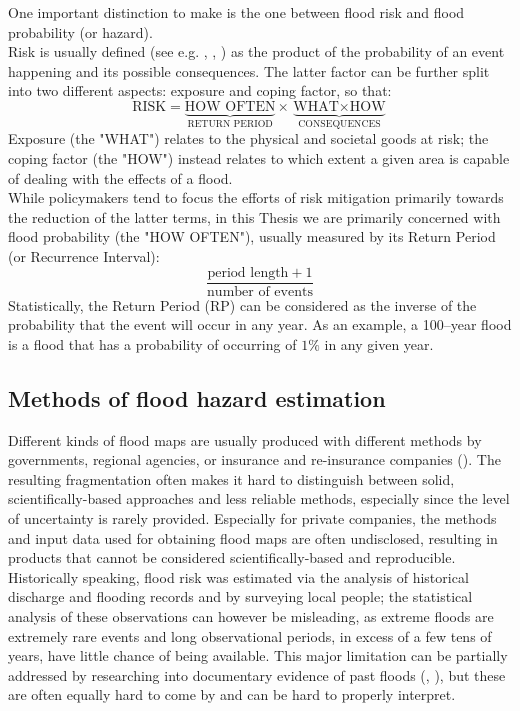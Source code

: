One important distinction to make is the one between flood risk and flood probability (or hazard).\\
Risk is usually defined (see e.g. , \cite{Kron2002, DeMoel2009}, \cite{Merz2007}) as the product of the probability of an event happening and its possible consequences. The latter factor can be further split into two different aspects: exposure and coping factor, so that:
$$\text{RISK} = \underbrace{\text{HOW OFTEN}}_\text{RETURN PERIOD} \times \underbrace{\text{WHAT} \times \text{HOW}}_\text{CONSEQUENCES}$$
Exposure (the "WHAT") relates to the physical and societal goods at risk; the coping factor (the "HOW") instead relates to which extent a given area is capable of dealing with the effects of a flood.\\
While policymakers tend to focus the efforts of risk mitigation primarily towards the reduction of the latter terms, in this Thesis we are primarily concerned with flood probability (the "HOW OFTEN"), usually measured by its Return Period (or Recurrence Interval):
$$\frac{\text{period length} + 1}{\text{number of events}}$$
Statistically, the Return Period (RP) can be considered as the inverse of the probability that the event will occur in any year. As an example, a 100--year flood is a flood that has a probability of occurring of $1\%$ in any given year.

\subsection{Methods of flood hazard estimation}\label{subs:flood_hazard_methods}
Different kinds of flood maps are usually produced with different methods by governments, regional agencies, or insurance and re-insurance companies (\cite{DeMoel2009}). The resulting fragmentation often makes it hard to distinguish between solid, scientifically-based approaches and less reliable methods, especially since the level of uncertainty is rarely provided. Especially for private companies, the methods and input data used for obtaining flood maps are often undisclosed, resulting in products that cannot be considered scientifically-based and reproducible.\\

Historically speaking, flood risk was estimated via the analysis of historical discharge and flooding records and by surveying local people; the statistical analysis of these observations can however be misleading, as extreme floods are extremely rare events and long observational periods, in excess of a few tens of years, have little chance of being available. This major limitation can be partially addressed by researching into documentary evidence of past floods (\cite{Kjeldsen2014}, \cite{Reed2002}), but these are often equally hard to come by and can be hard to properly interpret.\\

